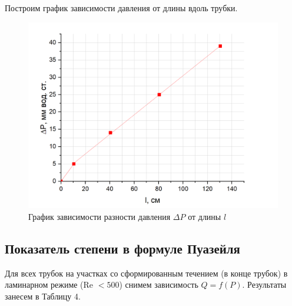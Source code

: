 \documentclass[a4paper,12pt]{article}
\theoremstyle{plain} %
\theoremstyle{definition} %
\theoremstyle{remark} %
\begin{document}
\noindent Построим график зависимости давления от длины вдоль трубки.
\begin{figure}[h]
	\begin{center}
		\includegraphics[width=0.55\linewidth]{7}
	\end{center}
\caption{График зависимости разности давления $\Delta P$ от длины $l$}
\end{figure}


\subsection{Показатель степени в формуле Пуазейля}
Для всех трубок на участках со сформированным течением (в конце трубок) в ламинарном режиме (Re $< 500$) снимем зависимость $Q = f(P)$. Результаты занесем в Таблицу 4.
\end{document}
